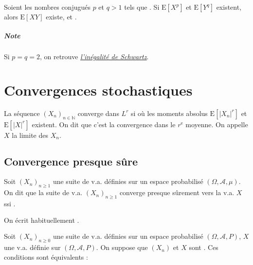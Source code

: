 \documentclass[10pt, french]{report}
\begin{document}
\begin{multicols*}{2}
\begin{definitionNOHFILL}
Soient les nombres conjugués $p$ et $q > 1$ tels que . Si $\text{E}[X^{p}]$ et $\text{E}[Y^{q}]$ existent, alors $\text{E}[XY]	$ existe, et .

\paragraph{Note}	Si $p = q = 2$, on retrouve \textit{\color{bleudefrance}\underline{\hyperlink{SchwartzInegality}{\color{bleudefrance} l'inégalité de Schwartz}}}.
\end{definitionNOHFILL}



\newpage
\chapter{Convergences stochastiques}
\begin{definitionNOHFILL}[Convergence $L^{r}$]
La séquence $(X_{n})_{n \in \mathbb{N}}$ converge dans $L^{r}$ si  où les moments absolus $\text{E}[|X_{n}|^{r}]$ et $\text{E}[|X|^{r}]$ existent. On dit que c'est la convergence dans le $r^{\text{e}}$ moyenne. On appelle $X$ la limite des $X_{n}$.
\end{definitionNOHFILL}


\section{Convergence presque sûre}
\begin{definitionNOHFILL}
Soit $(X_{n})_{n \geq 1}$ une suite de v.a. définies sur un espace probabilisé $(\Omega, \mathcal{A}, \mu)$. On dit que la suite de v.a. $(X_{n})_{n \geq 1}$ converge presque sûrement vers la v.a. $X$ ssi . 

\bigskip

On écrit habituellement .
\end{definitionNOHFILL}

\begin{definitionNOHFILLprop}
Soit $(X_{n})_{n \geq 0}$ une suite de v.a. définies sur un espace probabilisé $(\Omega, \mathcal{A}, P)$, $X$ une v.a. définie sur $(\Omega, \mathcal{A}, P)$. On suppose que $(X_{n})$ et $X$ sont . Ces conditions sont équivalents : 


\end{definitionNOHFILLprop}
\end{multicols*}
\end{document}
